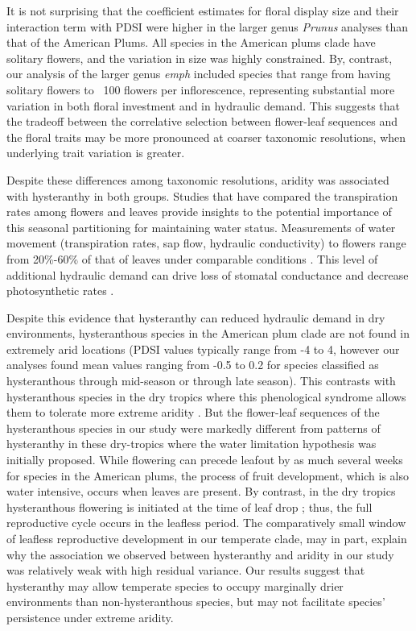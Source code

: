 \documentclass{article}[12pt]
\begin{document}
{It is not surprising that the coefficient estimates for floral display size and their interaction term with PDSI were higher in the larger genus \emph{Prunus} analyses than that of the American Plums. All species in the American plums clade have solitary flowers, and the variation in size was highly constrained. By, contrast, our analysis of the larger genus \emph{emph} included species that range from having solitary flowers to ~100 flowers per inflorescence, representing substantial more variation in both floral investment and in hydraulic demand. This suggests that the tradeoff between the correlative selection between flower-leaf sequences and the floral traits may be more pronounced at coarser taxonomic resolutions, when underlying trait variation is greater.

Despite these differences among taxonomic resolutions, aridity was associated with hysteranthy in both groups. Studies that have compared the transpiration rates among flowers and leaves provide insights to the potential importance of this seasonal partitioning for maintaining water status. Measurements of water movement (transpiration rates, sap flow, hydraulic conductivity) to flowers range from 20\%-60\% of that of leaves under comparable conditions \citep{Whiley:1988uf,Roddy:2012wn,Liu:2017wg,McMann:2022ww}. This level of additional hydraulic demand can drive loss of stomatal conductance and decrease photosynthetic rates \citep{Galen:1999vr}.
 
Despite this evidence that hysteranthy can reduced hydraulic demand in dry environments, hysteranthous species in the American plum clade are not found in extremely arid locations (PDSI values typically range from -4 to 4, however our analyses found mean values ranging from -0.5 to 0.2 for species classified as hysteranthous through mid-season or through late season). This contrasts with hysteranthous species in the dry tropics where this phenological syndrome allows them to tolerate more extreme aridity \citep{Franklin2016}. But the flower-leaf sequences of the hysteranthous species in our study were markedly different from patterns of hysteranthy in these dry-tropics where the water limitation hypothesis was initially proposed. While flowering can precede leafout by as much several weeks for species in the American plums, the process of fruit development, which is also water intensive, occurs when leaves are present. By contrast, in the dry tropics hysteranthous flowering is initiated at the time of leaf drop \citep{Borchert1983,Franklin2016}; thus, the full reproductive cycle occurs in the leafless period. The comparatively small window of leafless reproductive development in our temperate clade, may in part, explain why the association we observed between hysteranthy and aridity in our study was relatively weak with high residual variance. Our results suggest that hysteranthy may allow temperate species to occupy marginally drier environments than non-hysteranthous species, but may not facilitate species' persistence under extreme aridity. 

}
\end{document}
